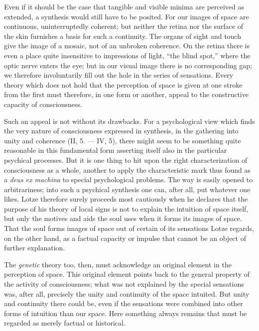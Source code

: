 \documentclass[12pt,a4paper]{book}
\newcommand{\opage}[1]{\marginnote{\footnotesize\textit{[#1]}}}
\begin{document}
Even if it should be the case that tangible and visible minima are
perceived as extended, a synthesis would still have to be posited. For
our images of space are continuous, uninterruptedly coherent; but neither
the retina nor the surface of the skin furnishes a basis for such a
continuity. The organs of sight and touch give the image of a mosaic,
not of an unbroken coherence. On the retina there is even a place quite
insensitive to impressions of light, ``the blind spot,'' where the optic
nerve enters the eye; but in our visual image there is no corresponding
gap; we therefore involuntarily fill out the hole in the series of
sensations. Every theory which does not hold that the perception of
space is given at one stroke from the first must therefore, in one form
or another, appeal to the constructive capacity of consciousness.


\opage{248}Such an appeal is not without its drawbacks. For a
psychological view which finds the very nature of consciousness expressed
in synthesis, in the gathering into unity and coherence (II, 5. --- IV,
5), there might seem to be something quite reasonable in this
fundamental form asserting itself also in the particular psychical
processes. But it is one thing to hit upon the right characterization
of consciousness as a whole, another to apply the characteristic mark
thus found as a \textit{deus ex machina} to special psychological
problems. The way is easily opened to arbitrariness; into such a
psychical synthesis one can, after all, put whatever one likes. Lotze
therefore surely proceeds most cautiously when he declares that the
purpose of his theory of local signs is not to explain the intuition of
space itself, but only the motives and aids the soul uses when it forms
its images of space. That the soul forms images of space out of certain
of its sensations Lotze regards, on the other hand, as a factual
capacity or impulse that cannot be an object of further explanation.

The \emph{genetic} theory too, then, must acknowledge an original element
in the perception of space. This original element points back to the
general property of the activity of consciousness; what was not
explained by the special sensations was, after all, precisely the unity
and continuity of the space intuited. But unity and continuity there
could be, even if the sensations were combined into other forms of
intuition than our space. Here something always remains that must be
regarded as merely factual or historical.
\end{document}
